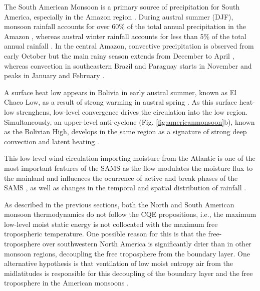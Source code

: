 
The South American Monsoon is a primary source of precipitation for South America, especially in the Amazon region \citep{gan2004,vera2006,jones2013}.
During austral summer (DJF), monsoon rainfall accounts for over 60\% of the total annual precipitation in the Amazon \citep{gan2004,marengo2012}, whereas
austral winter rainfall accounts for less than 5\% of the total annual rainfall \citep{vera2006}.
In the central Amazon, convective precipitation is observed from early October but the main rainy season extends from December to April \citep{machado2004,adams2013}, whereas convection in southeastern Brazil and Paraguay starts in November and peaks in January and February \citep{marengo2001,nieto2011}. 

A surface heat low appears in Bolivia in early austral summer, known as El Chaco Low, as a result of strong warming in austral spring \citep{marengo2012,sulca2018}.
 As this surface heat-low strenghens, low-level convergence drives the circulation into the low region.
 Simultaneously, an upper-level anti-cyclone (Fig. \ref{fig:americanmonsoon}b), known as the Bolivian High, develops in the same region as a signature of strong deep convection and latent heating \citep{marengo2001,vera2006}.

This low-level wind circulation importing moisture from the Atlantic is one of the most important features of the SAMS \citep{marengo2012,wang2017} as the flow modulates the moisture flux to the mainland and influences the ocurrence of active and break phases of the SAMS \citep{jones2002}, as well as changes in the temporal and spatial
distribution of rainfall \citep[e.g.][]{giannini2004,bombardi2011}.

As described in the previous sections, both the North and South American monsoon thermodynamics do not follow the CQE propositions, i.e., the maximum low-level moist static energy is not collocated with the maximum free tropospheric temperature. 
One possible reason for this is that the free-troposphere over southwestern North America is significantly drier than in other monsoon regions, decoupling the free troposphere from the boundary layer. One alternative hypothesis is that ventilation of low moist entropy air from the midlatitudes is responsible for this decoupling of the boundary layer and the free troposphere in the American monsoons \citep{boos2015review}.

